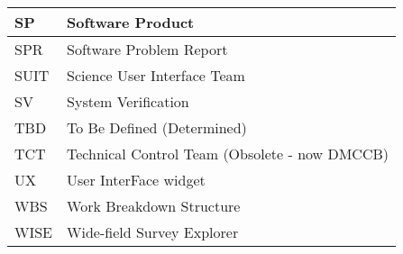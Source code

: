 \begin{longtable}{|l|p{}|}
SP&Software Product \\\hline
SPR&Software Problem Report \\\hline
SUIT&Science User Interface Team \\\hline
SV&System Verification \\\hline
TBD&To Be Defined (Determined) \\\hline
TCT&Technical Control Team (Obsolete - now DMCCB) \\\hline
UX&User InterFace widget \\\hline
WBS&Work Breakdown Structure \\\hline
WISE&Wide-field Survey Explorer \\\hline
\end{longtable} 
